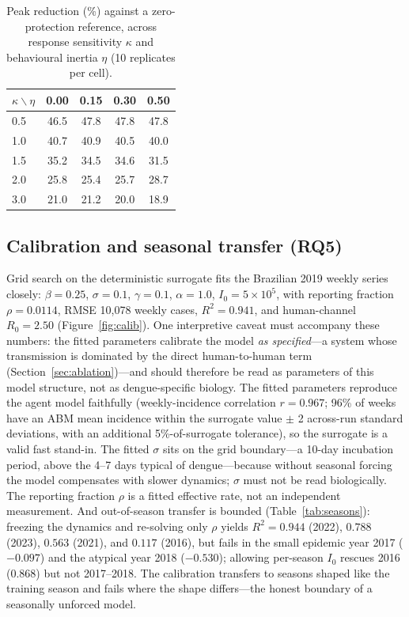 \documentclass[]{interact}
\begin{document}
\begin{table}[htb]
\centering
\small
\begin{tabular}{lcccc}
\hline
$\kappa \backslash \eta$ & 0.00 & 0.15 & 0.30 & 0.50 \\
\hline
0.5 & 46.5 & 47.8 & 47.8 & 47.8 \\
1.0 & 40.7 & 40.9 & 40.5 & 40.0 \\
1.5 & 35.2 & 34.5 & 34.6 & 31.5 \\
2.0 & 25.8 & 25.4 & 25.7 & 28.7 \\
3.0 & 21.0 & 21.2 & 20.0 & 18.9 \\
\hline
\end{tabular}
\caption{Peak reduction (\%) against a zero-protection reference, across response sensitivity $\kappa$ and behavioural inertia $\eta$ (10 replicates per cell).}
\label{tab:kappa}
\end{table}

\subsection{Calibration and seasonal transfer (RQ5)}
\label{sec:calib}

Grid search on the deterministic surrogate fits the Brazilian 2019 weekly series closely: $\beta{=}0.25$, $\sigma{=}0.1$, $\gamma{=}0.1$, $\alpha{=}1.0$, $I_0{=}5{\times}10^{5}$, with reporting fraction $\rho{=}0.0114$, RMSE 10{,}078 weekly cases, $R^{2}{=}0.941$, and human-channel $R_0{=}2.50$ (Figure~\ref{fig:calib}). One interpretive caveat must accompany these numbers: the fitted parameters calibrate the model \emph{as specified}---a system whose transmission is dominated by the direct human-to-human term (Section~\ref{sec:ablation})---and should therefore be read as parameters of this model structure, not as dengue-specific biology. The fitted parameters reproduce the agent model faithfully (weekly-incidence correlation $r{=}0.967$; 96\% of weeks have an ABM mean incidence within the surrogate value $\pm$ 2 across-run standard deviations, with an additional 5\%-of-surrogate tolerance), so the surrogate is a valid fast stand-in. The fitted $\sigma$ sits on the grid boundary---a 10-day incubation period, above the 4--7 days typical of dengue---because without seasonal forcing the model compensates with slower dynamics; $\sigma$ must not be read biologically. The reporting fraction $\rho$ is a fitted effective rate, not an independent measurement. And out-of-season transfer is bounded (Table~\ref{tab:seasons}): freezing the dynamics and re-solving only $\rho$ yields $R^{2}=0.944$ (2022), $0.788$ (2023), $0.563$ (2021), and $0.117$ (2016), but fails in the small epidemic year 2017 ($-0.097$) and the atypical year 2018 ($-0.530$); allowing per-season $I_0$ rescues 2016 (0.868) but not 2017--2018. The calibration transfers to seasons shaped like the training season and fails where the shape differs---the honest boundary of a seasonally unforced model.
\end{document}
